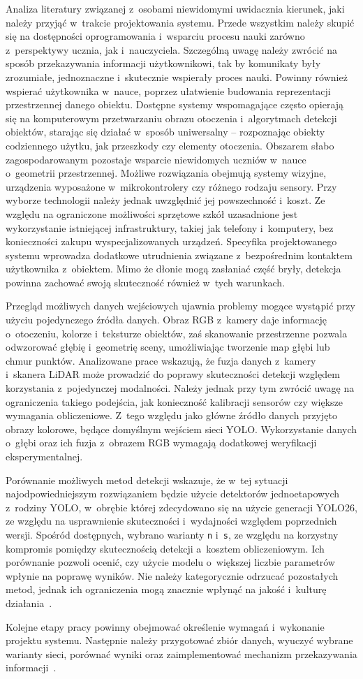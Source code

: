 Analiza literatury związanej z~osobami niewidomymi uwidacznia kierunek, jaki należy przyjąć w~trakcie projektowania systemu. Przede wszystkim należy skupić się na dostępności oprogramowania i~wsparciu procesu nauki zarówno z~perspektywy ucznia, jak i~nauczyciela. Szczególną uwagę należy zwrócić na sposób przekazywania informacji użytkownikowi, tak by komunikaty były zrozumiałe, jednoznaczne i~skutecznie wspierały proces nauki. Powinny również wspierać użytkownika w~nauce, poprzez ułatwienie budowania reprezentacji przestrzennej danego obiektu. Dostępne systemy wspomagające często opierają się na komputerowym przetwarzaniu obrazu otoczenia i~algorytmach detekcji obiektów, starając się działać w~sposób uniwersalny -- rozpoznając obiekty codziennego użytku, jak przeszkody czy elementy otoczenia. Obszarem słabo zagospodarowanym pozostaje wsparcie niewidomych uczniów w~nauce o~geometrii przestrzennej. Możliwe rozwiązania obejmują systemy wizyjne, urządzenia wyposażone w~mikrokontrolery czy różnego rodzaju sensory. Przy wyborze technologii należy jednak uwzględnić jej powszechność i~koszt. Ze względu na ograniczone możliwości sprzętowe szkół uzasadnione jest wykorzystanie istniejącej infrastruktury, takiej jak telefony i~komputery, bez konieczności zakupu wyspecjalizowanych urządzeń. Specyfika projektowanego systemu wprowadza dodatkowe utrudnienia związane z~bezpośrednim kontaktem użytkownika z~obiektem. Mimo że dłonie mogą zasłaniać część bryły, detekcja powinna zachować swoją skuteczność również w~tych warunkach.

Przegląd możliwych danych wejściowych ujawnia problemy mogące wystąpić przy użyciu pojedynczego źródła danych. Obraz RGB z~kamery daje informację o~otoczeniu, kolorze i~teksturze obiektów, zaś skanowanie przestrzenne pozwala odwzorować głębię i~geometrię sceny, umożliwiając tworzenie map głębi lub chmur punktów. Analizowane prace wskazują, że fuzja danych z~kamery i~skanera LiDAR może prowadzić do poprawy skuteczności detekcji względem korzystania z~pojedynczej modalności.
Należy jednak przy tym zwrócić uwagę na ograniczenia takiego podejścia, jak konieczność kalibracji sensorów czy większe wymagania obliczeniowe. Z~tego względu jako główne źródło danych przyjęto obrazy kolorowe, będące domyślnym wejściem sieci YOLO. Wykorzystanie danych o~głębi oraz ich fuzja z~obrazem RGB wymagają dodatkowej weryfikacji eksperymentalnej.

Porównanie możliwych metod detekcji wskazuje, że w~tej sytuacji najodpowiedniejszym rozwiązaniem będzie użycie detektorów jednoetapowych z~rodziny YOLO, w~obrębie której zdecydowano się na użycie generacji YOLO26, ze względu na usprawnienie skuteczności i~wydajności względem poprzednich wersji. Spośród dostępnych, wybrano warianty \texttt{n} i~\texttt{s}, ze względu na korzystny kompromis pomiędzy skutecznością detekcji a~kosztem obliczeniowym. Ich porównanie pozwoli ocenić, czy użycie modelu o~większej liczbie parametrów wpłynie na poprawę wyników. Nie należy kategorycznie odrzucać pozostałych metod, jednak ich ograniczenia mogą znacznie wpłynąć na jakość i~kulturę działania~.

Kolejne etapy pracy powinny obejmować określenie wymagań i~wykonanie projektu systemu. Następnie należy przygotować zbiór danych, wyuczyć wybrane warianty sieci, porównać wyniki oraz zaimplementować mechanizm przekazywania informacji~.
